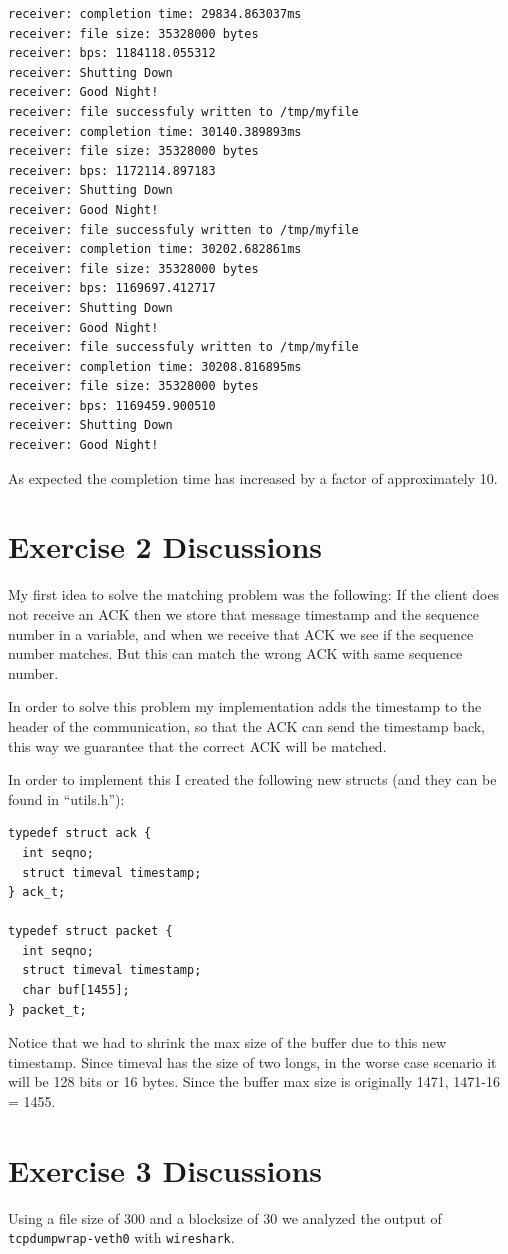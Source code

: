 \documentclass[paper=a4, fontsize=11pt]{scrartcl}
\numberwithin{equation}{section}		%
\numberwithin{figure}{section}			%
\numberwithin{table}{section}				%
\begin{document}
\begin{verbatim}
receiver: completion time: 29834.863037ms
receiver: file size: 35328000 bytes
receiver: bps: 1184118.055312
receiver: Shutting Down
receiver: Good Night!
receiver: file successfuly written to /tmp/myfile
receiver: completion time: 30140.389893ms
receiver: file size: 35328000 bytes
receiver: bps: 1172114.897183
receiver: Shutting Down
receiver: Good Night!
receiver: file successfuly written to /tmp/myfile
receiver: completion time: 30202.682861ms
receiver: file size: 35328000 bytes
receiver: bps: 1169697.412717
receiver: Shutting Down
receiver: Good Night!
receiver: file successfuly written to /tmp/myfile
receiver: completion time: 30208.816895ms
receiver: file size: 35328000 bytes
receiver: bps: 1169459.900510
receiver: Shutting Down
receiver: Good Night!
\end{verbatim}

As expected the completion time has increased by a factor of approximately 10.

\section{Exercise 2 Discussions}
My first idea to solve the matching problem was the following:
If the client does not receive an ACK then we store that message
timestamp and the sequence number in a variable, and when we receive
that ACK we see if the sequence number matches. But this can
match the wrong ACK with same sequence number.

In order to solve this problem my implementation adds the timestamp
to the header of the communication, so that the ACK can send the timestamp
back, this way we guarantee that the correct ACK will be matched.

In order to implement this I created the following new structs (and they can be found in ``utils.h''):

\begin{lstlisting}
typedef struct ack {
  int seqno;
  struct timeval timestamp;
} ack_t;

typedef struct packet {
  int seqno;
  struct timeval timestamp;
  char buf[1455];
} packet_t;
\end{lstlisting}

Notice that we had to shrink the max size of the buffer due to this new
timestamp. Since timeval has the size of two longs, in the worse case scenario
it will be 128 bits or 16 bytes.
Since the buffer max size is originally 1471, 1471-16 = 1455.

\section{Exercise 3 Discussions}
Using a file size of 300 and a blocksize of 30 we analyzed the
output of \texttt{tcpdumpwrap-veth0} with \texttt{wireshark}.
\end{document}
